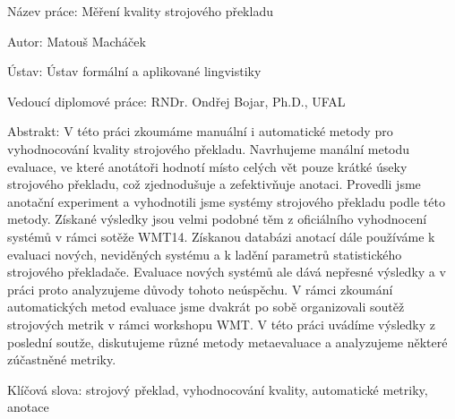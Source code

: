 Název práce:
Měření kvality strojového překladu

Autor:
Matouš Macháček

Ústav:
Ústav formální a aplikované lingvistiky

Vedoucí diplomové práce:
RNDr. Ondřej Bojar, Ph.D., UFAL

Abstrakt: V této práci zkoumáme manuální i automatické metody pro vyhodnocování
kvality strojového překladu. Navrhujeme manální metodu evaluace, ve které
anotátoři hodnotí místo celých vět pouze krátké úseky strojového překladu, což
zjednodušuje a zefektivňuje anotaci. Provedli jsme anotační experiment a
vyhodnotili jsme systémy strojového překladu podle této metody. Získané
výsledky jsou velmi podobné těm z oficiálního vyhodnocení systémů v rámci
sotěže WMT14. Získanou databázi anotací dále používáme k evaluaci nových,
neviděných systému a k ladění parametrů statistického strojového překladače.
Evaluace nových systémů ale dává nepřesné výsledky a v práci proto analyzujeme
důvody tohoto neúspěchu. V rámci zkoumání automatických metod evaluace jsme
dvakrát po sobě organizovali soutěž strojových metrik v rámci workshopu WMT.  V
této práci uvádíme výsledky z poslední soutže, diskutujeme různé metody
metaevaluace a analyzujeme některé zúčastněné metriky. 

Klíčová slova:
strojový překlad, vyhodnocování kvality, automatické metriky, anotace
